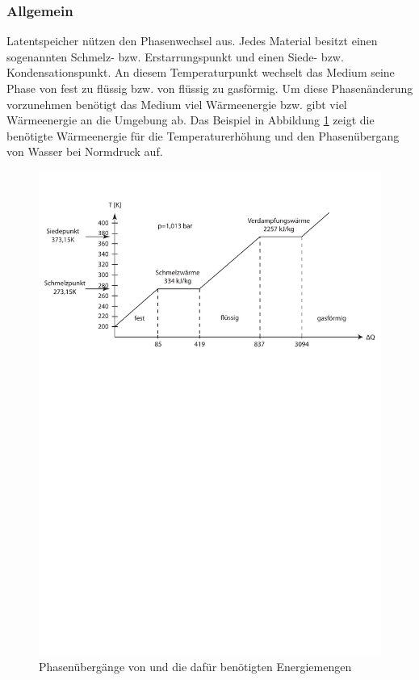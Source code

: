 \documentclass[11pt,a4paper]{scrartcl}
\begin{document}
\subsubsection{Allgemein}
Latentspeicher nützen den Phasenwechsel aus. Jedes Material besitzt einen
sogenannten Schmelz- bzw. Erstarrungspunkt und einen Siede- bzw.
Kondensationspunkt. An diesem Temperaturpunkt wechselt das Medium seine Phase
von fest zu flüssig bzw. von flüssig zu gasförmig. Um diese Phasenänderung
vorzunehmen benötigt das Medium viel Wärmeenergie bzw. gibt viel Wärmeenergie an
die Umgebung ab. Das Beispiel in Abbildung \ref{fig:H2O} zeigt die benötigte
Wärmeenergie für die Temperaturerhöhung und den Phasenübergang von Wasser bei
Normdruck auf.

\begin{figure}[h]
\begin{center}
\includegraphics[scale=0.6]{images/Phasendiagramm.pdf}
\caption{Phasenübergänge von  und die dafür benötigten Energiemengen}
\label{fig:H2O}
\end{center}
\end{figure}
\end{document}
